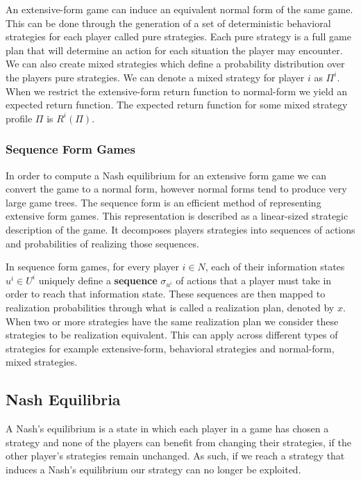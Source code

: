 An extensive-form game can induce an equivalent normal form of the same game.
This can be done through the generation of a set of deterministic behavioral strategies for each player
called pure strategies.
Each pure strategy is a full game plan that will determine an action for each situation the player may encounter.
We can also create mixed strategies which define a probability distribution over the players pure strategies.
We can denote a mixed strategy for player $i$ as $\Pi^i$.
When we restrict the extensive-form return function to normal-form we yield an expected return function.
The expected return function for some mixed strategy profile $\Pi$ is $R^i(\Pi)$\citep{heinrich2017reinforcement}.

\subsubsection{Sequence Form Games}
In order to compute a Nash equilibrium for an extensive form game we can convert the game to a normal form,
however normal forms tend to produce very large game trees.
The sequence form is an efficient method of representing extensive form games\citep{koller1996efficient}.
This representation is described as a linear-sized strategic description of the game.
It decomposes players strategies into sequences of actions and probabilities of realizing those sequences.

In sequence form games, for every player $i\in N$, each of their information states $u^i\in U^i$
uniquely define a \textbf{sequence} $\sigma_{u^i}$ of actions that a player must take in order to reach
that information state.
These sequences are then mapped to realization probabilities through what is called a realization plan,
denoted by $x$.
When two or more strategies have the same realization plan we consider these strategies to be
realization equivalent\citep{von1996efficient}.
This can apply across different types of strategies for example extensive-form, behavioral strategies
and normal-form, mixed strategies\citep{kuhn2016extensive}.

\subsection{Nash Equilibria}\label{subsec:nashEquilibria}
A Nash's equilibrium is a state in which each player in a game has chosen a strategy and
none of the players can benefit from changing their strategies, if the other player's strategies remain unchanged.
As such, if we reach a strategy that induces a Nash's equilibrium our strategy can no longer be exploited.

